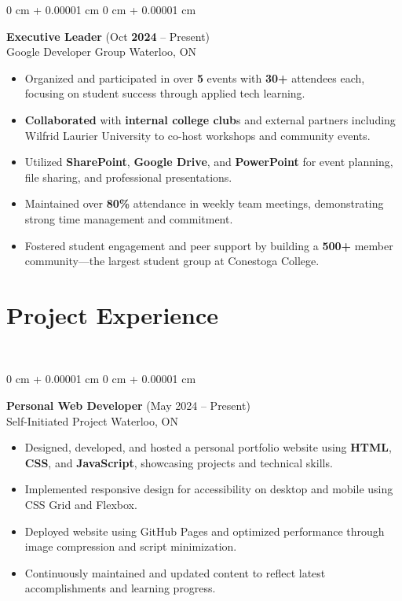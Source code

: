 \documentclass[10pt, letterpaper]{article}
\newenvironment{highlights}{
    \begin{itemize}[
        topsep=0.10 cm,
        parsep=0.10 cm,
        partopsep=0pt,
        itemsep=0pt,
        leftmargin=0 cm + 10pt
    ]
}{
    \end{itemize}
} %
\newenvironment{onecolentry}{
    \begin{adjustwidth}{
        0 cm + 0.00001 cm
    }{
        0 cm + 0.00001 cm
    }
}{
    \end{adjustwidth}
} %
\begin{document}
\begin{onecolentry}
    {\normalsize \textbf{Executive Leader}} \hfill {(Oct \textbf{2024} – Present)}\\
    {Google Developer Group} \hfill {Waterloo, ON}\\
    \begin{highlights}
        \item Organized and participated in over \textbf{5} events with \textbf{30+} attendees each, focusing on student success through applied tech learning.
        \item \textbf{Collaborated} with \textbf{internal college club}s and external partners including Wilfrid Laurier University to co-host workshops and community events.
        \item Utilized \textbf{SharePoint}, \textbf{Google Drive}, and \textbf{PowerPoint} for event planning, file sharing, and professional presentations.
        \item Maintained over \textbf{80\%} attendance in weekly team meetings, demonstrating strong time management and commitment.
        \item Fostered student engagement and peer support by building a \textbf{500+} member community—the largest student group at Conestoga College.
    \end{highlights}
\end{onecolentry}






\vspace{-12pt}
\section{Project Experience}
\vspace{-12pt}
\hrulefill\\
\begin{onecolentry}
    {\normalsize \textbf{Personal Web Developer}} \hfill {(May 2024 – Present)}\\
    {Self-Initiated Project} \hfill {Waterloo, ON}\\
    \begin{highlights}
        \item Designed, developed, and hosted a personal portfolio website using \textbf{HTML}, \textbf{CSS}, and \textbf{JavaScript}, showcasing projects and technical skills.
        \item Implemented responsive design for accessibility on desktop and mobile using CSS Grid and Flexbox.
        \item Deployed website using GitHub Pages and optimized performance through image compression and script minimization.
        \item Continuously maintained and updated content to reflect latest accomplishments and learning progress.
    \end{highlights}
\end{onecolentry}
\end{document}

